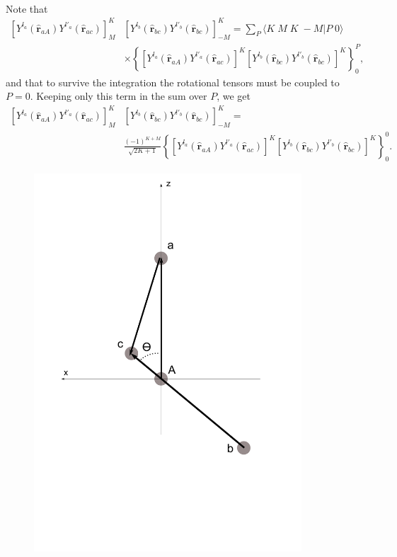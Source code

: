 \begin{subappendices}
\begin{equation}
\begin{split}
\end{split}
\end{equation}
Note that
\begin{equation}\label{eqC6AppG19}
\begin{split}
\left[ Y^{l_a} (\hat{\mathbf r}_{aA}) Y^{l'_a} (\hat{ \mathbf r}_{ac})\right]^K_M &   \left[ Y^{l_b} (\hat{\mathbf r}_{bc}) Y^{l'_b} (\hat{\mathbf r}_{bc})\right]^{K}_{-M}=\sum_P \langle K\;M\;K\;-M|P\;0\rangle\\
&\times \left\{\left[ Y^{l_a} (\hat{\mathbf r}_{aA}) Y^{l'_a} (\hat{ \mathbf r}_{ac})\right]^K\left[ Y^{l_b} (\hat{\mathbf r}_{bc}) Y^{l'_b} (\hat{\mathbf r}_{bc})\right]^{K} \right\}^P_0,
\end{split}
\end{equation}
and that to survive the integration the rotational tensors must be coupled to $P=0$. Keeping only this term in the sum over $P$, we get
\begin{equation}\label{eqC6AppF17}
\begin{split}
\left[ Y^{l_a} (\hat{\mathbf r}_{aA}) Y^{l'_a} (\hat{ \mathbf r}_{ac})\right]^K_M &   \left[ Y^{l_b} (\hat{\mathbf r}_{bc}) Y^{l'_b} (\hat{\mathbf r}_{bc})\right]^{K}_{-M}=\\
&\frac{(-1)^{K+M}}{\sqrt{2K+1}}\left\{\left[ Y^{l_a} (\hat{\mathbf r}_{aA}) Y^{l'_a} (\hat{ \mathbf r}_{ac})\right]^K\left[ Y^{l_b} (\hat{\mathbf r}_{bc}) Y^{l'_b} (\hat{\mathbf r}_{bc})\right]^{K} \right\}^0_0.
\end{split}
\end{equation}
 \begin{figure}
\centerline{\includegraphics*[width=10cm,angle=0]{C6/figs_C6/coords2.pdf}}

\end{figure}
\end{subappendices}
